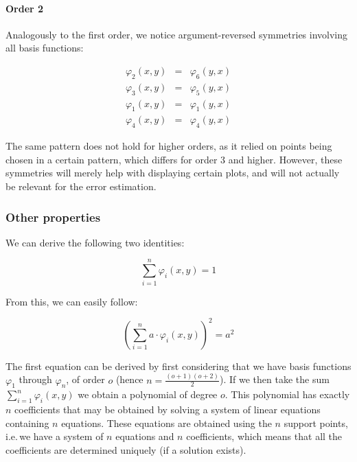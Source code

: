 \documentclass[a4paper, twoside]{article}
\renewcommand{\phi}{\varphi}
\begin{document}
\paragraph{Order 2}

Analogously to the first order, we notice argument-reversed symmetries involving all basis functions:

\begin{eqnarray*}
  \phi_2(x,y) & = & \phi_6(y,x) \\
  \phi_3(x,y) & = & \phi_5(y,x) \\
  \phi_1(x,y) & = & \phi_1(y,x) \\
  \phi_4(x,y) & = & \phi_4(y,x)
\end{eqnarray*}

The same pattern does not hold for higher orders, as it relied on points being chosen in a certain pattern, which differs for order 3 and higher. However, these symmetries will merely help with displaying certain plots, and will not actually be relevant for the error estimation.

\subsubsection{Other properties}
\label{sec:basis-functions-other-properties}

We can derive the following two identities:

\begin{equation}
  \label{eq:sum-basis-functions-is-1}
  \sum_{i=1}^n \phi_i(x,y) = 1
\end{equation}

From this, we can easily follow:

\begin{equation}
  \label{eq:sum-basis-functions-squared}
  \left( \sum_{i=1}^n a \cdot \phi_i(x,y) \right)^2 = a^2
\end{equation}

The first equation can be derived by first considering that we have basis functions $\phi_1$ through $\phi_n$, of order $o$ (hence $n=\frac{(o+1)(o+2)}{2}$). If we then take the sum $\sum_{i=1}^n \phi_i(x,y)$ we obtain a polynomial of degree $o$. This polynomial has exactly $n$ coefficients that may be obtained by solving a system of linear equations containing $n$ equations. These equations are obtained using the $n$ support points, i.e.\,we have a system of $n$ equations and $n$ coefficients, which means that all the coefficients are determined uniquely (if a solution exists).
\end{document}

